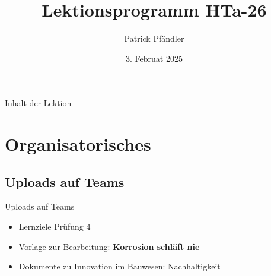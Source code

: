 

\def\customoptions{aspectratio=169} %



\title{\textbf{Lektionsprogramm HTa-26}}
\author{Patrick Pfändler}
\date{3. Februat 2025}




\frame{\titlepage}

\begin{frame}{Inhalt der Lektion}
	\tableofcontents
\end{frame}

\folieFragen

\section{Organisatorisches}
\BlueSectionSlide

\subsection{Uploads auf Teams}
\begin{frame}{Uploads auf Teams}
	\begin{itemize}
		\item[\textbullet] Lernziele Prüfung 4
		\item[\textbullet] Vorlage zur Bearbeitung: \textbf{Korrosion schläft nie}
		\item[\textbullet] Dokumente zu Innovation im Bauwesen: Nachhaltigkeit
	\end{itemize}

\end{frame}


